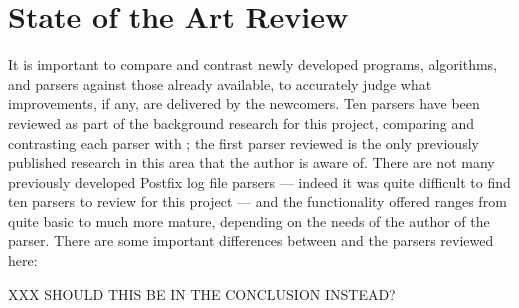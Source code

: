 \chapter{State of the Art Review}

\label{state of the art review}

It is important to compare and contrast newly developed programs,
algorithms, and parsers against those already available, to accurately
judge what improvements, if any, are delivered by the newcomers.  Ten
parsers have been reviewed as part of the background research for this
project, comparing and contrasting each parser with \parsername{}; the
first parser reviewed is the only previously published research in this
area that the author is aware of.    There are not many previously
developed Postfix log file parsers --- indeed it was quite difficult to
find ten parsers to review for this project --- and the functionality
offered ranges from quite basic to much more mature, depending on the needs
of the author of the parser.  There are some important differences between
\parsername{} and the parsers reviewed here:

XXX SHOULD THIS BE IN THE CONCLUSION INSTEAD\@?

